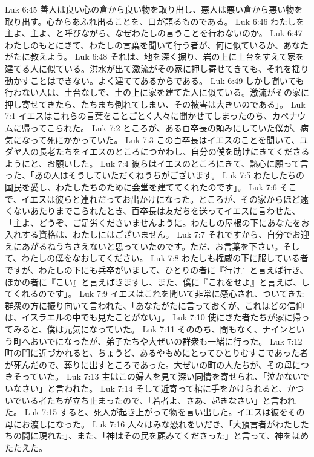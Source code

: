 Luk 6:45  善人は良い心の倉から良い物を取り出し、悪人は悪い倉から悪い物を取り出す。心からあふれ出ることを、口が語るものである。
Luk 6:46  わたしを主よ、主よ、と呼びながら、なぜわたしの言うことを行わないのか。
Luk 6:47  わたしのもとにきて、わたしの言葉を聞いて行う者が、何に似ているか、あなたがたに教えよう。
Luk 6:48  それは、地を深く掘り、岩の上に土台をすえて家を建てる人に似ている。洪水が出て激流がその家に押し寄せてきても、それを揺り動かすことはできない。よく建ててあるからである。
Luk 6:49  しかし聞いても行わない人は、土台なしで、土の上に家を建てた人に似ている。激流がその家に押し寄せてきたら、たちまち倒れてしまい、その被害は大きいのである」。
Luk 7:1  イエスはこれらの言葉をことごとく人々に聞かせてしまったのち、カペナウムに帰ってこられた。
Luk 7:2  ところが、ある百卒長の頼みにしていた僕が、病気になって死にかかっていた。
Luk 7:3  この百卒長はイエスのことを聞いて、ユダヤ人の長老たちをイエスのところにつかわし、自分の僕を助けにきてくださるようにと、お願いした。
Luk 7:4  彼らはイエスのところにきて、熱心に願って言った、「あの人はそうしていただくねうちがございます。
Luk 7:5  わたしたちの国民を愛し、わたしたちのために会堂を建ててくれたのです」。
Luk 7:6  そこで、イエスは彼らと連れだってお出かけになった。ところが、その家からほど遠くないあたりまでこられたとき、百卒長は友だちを送ってイエスに言わせた、「主よ、どうぞ、ご足労くださいませんように。わたしの屋根の下にあなたをお入れする資格は、わたしにはございません。
Luk 7:7  それですから、自分でお迎えにあがるねうちさえないと思っていたのです。ただ、お言葉を下さい。そして、わたしの僕をなおしてください。
Luk 7:8  わたしも権威の下に服している者ですが、わたしの下にも兵卒がいまして、ひとりの者に『行け』と言えば行き、ほかの者に『こい』と言えばきますし、また、僕に『これをせよ』と言えば、してくれるのです」。
Luk 7:9  イエスはこれを聞いて非常に感心され、ついてきた群衆の方に振り向いて言われた、「あなたがたに言っておくが、これほどの信仰は、イスラエルの中でも見たことがない」。
Luk 7:10  使にきた者たちが家に帰ってみると、僕は元気になっていた。
Luk 7:11  そののち、間もなく、ナインという町へおいでになったが、弟子たちや大ぜいの群衆も一緒に行った。
Luk 7:12  町の門に近づかれると、ちょうど、あるやもめにとってひとりむすこであった者が死んだので、葬りに出すところであった。大ぜいの町の人たちが、その母につきそっていた。
Luk 7:13  主はこの婦人を見て深い同情を寄せられ、「泣かないでいなさい」と言われた。
Luk 7:14  そして近寄って棺に手をかけられると、かついでいる者たちが立ち止まったので、「若者よ、さあ、起きなさい」と言われた。
Luk 7:15  すると、死人が起き上がって物を言い出した。イエスは彼をその母にお渡しになった。
Luk 7:16  人々はみな恐れをいだき、「大預言者がわたしたちの間に現れた」、また、「神はその民を顧みてくださった」と言って、神をほめたたえた。
